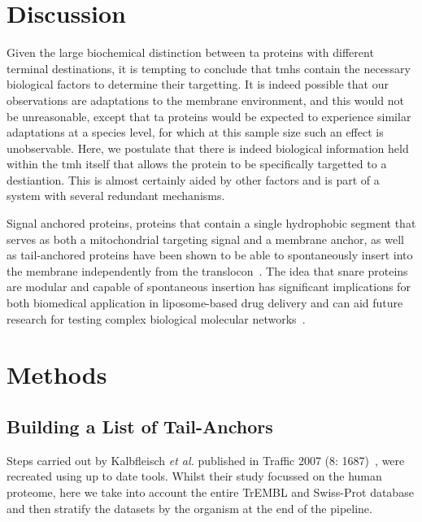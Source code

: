 \section{Discussion}

Given the large biochemical distinction between \gls{ta} proteins with different terminal destinations, it is tempting to conclude that \gls{tmh}s contain the necessary biological factors to determine their targetting.
It is indeed possible that our observations are adaptations to the membrane environment, and this would not be unreasonable, except that \gls{ta} proteins would be expected to experience similar adaptations at a species level, for which at this sample size such an effect is unobservable.
Here, we postulate that there is indeed biological information held within the \gls{tmh} itself that allows the protein to be specifically targetted to a destiantion.
This is almost certainly aided by other factors and is part of a system with several redundant mechanisms.

Signal anchored proteins, proteins that contain a single hydrophobic segment that serves as both a mitochondrial targeting signal and a membrane anchor, as well as tail-anchored proteins have been shown to be able to spontaneously insert into the membrane independently from the translocon~\cite{Elisa2012, Lan2000, Colombo2009}.
The idea that \gls{snare} proteins are modular and capable of spontaneous insertion has significant implications for both biomedical application in liposome-based drug delivery and can aid future research for testing complex biological molecular networks~\cite{Allen2013, Nordlund2014}.

\section{Methods}

\subsection{Building a List of Tail-Anchors}
Steps carried out by Kalbfleisch \textit{et al.} published in Traffic 2007 (8: 1687)~\cite{Kalbfleisch2007}, were recreated using up to date tools.
Whilst their study focussed on the human proteome, here we take into account the entire TrEMBL and Swiss-Prot database and then stratify the datasets by the organism at the end of the pipeline.

